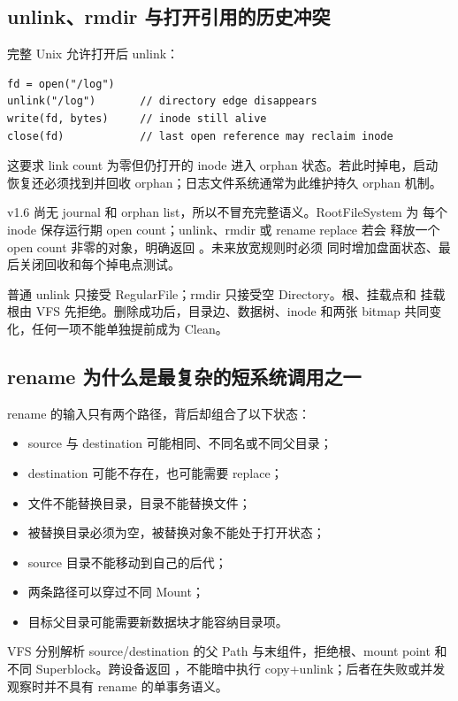 \subsection{unlink、rmdir 与打开引用的历史冲突}

完整 Unix 允许打开后 unlink：

\begin{lstlisting}[caption={成熟 Unix 中名字和打开生命周期分离}]
fd = open("/log")
unlink("/log")       // directory edge disappears
write(fd, bytes)     // inode still alive
close(fd)            // last open reference may reclaim inode
\end{lstlisting}

这要求 link count 为零但仍打开的 inode 进入 orphan 状态。若此时掉电，启动
恢复还必须找到并回收 orphan；日志文件系统通常为此维护持久 orphan 机制。

v1.6 尚无 journal 和 orphan list，所以不冒充完整语义。RootFileSystem 为
每个 inode 保存运行期 open count；unlink、rmdir 或 rename replace 若会
释放一个 open count 非零的对象，明确返回 。未来放宽规则时必须
同时增加盘面状态、最后关闭回收和每个掉电点测试。

普通 unlink 只接受 RegularFile；rmdir 只接受空 Directory。根、挂载点和
挂载根由 VFS 先拒绝。删除成功后，目录边、数据树、inode 和两张 bitmap
共同变化，任何一项不能单独提前成为 Clean。

\subsection{rename 为什么是最复杂的短系统调用之一}

rename 的输入只有两个路径，背后却组合了以下状态：

\begin{itemize}
  \item source 与 destination 可能相同、不同名或不同父目录；
  \item destination 可能不存在，也可能需要 replace；
  \item 文件不能替换目录，目录不能替换文件；
  \item 被替换目录必须为空，被替换对象不能处于打开状态；
  \item source 目录不能移动到自己的后代；
  \item 两条路径可以穿过不同 Mount；
  \item 目标父目录可能需要新数据块才能容纳目录项。
\end{itemize}

VFS 分别解析 source/destination 的父 Path 与末组件，拒绝根、mount point
和不同 Superblock。跨设备返回 ，不能暗中执行
copy+unlink；后者在失败或并发观察时并不具有 rename 的单事务语义。

